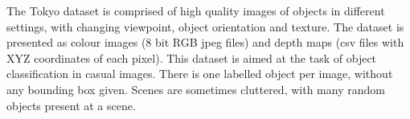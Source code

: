 	The Tokyo dataset is comprised of high quality images of objects in different settings, with changing viewpoint, object orientation and texture. The dataset is presented as colour images (8 bit RGB jpeg files) and depth maps (csv files with XYZ coordinates of each pixel).	This dataset is aimed at the task of object classification in casual images. There is one labelled object per image, without any bounding box given. Scenes are sometimes cluttered, with many random objects present at a scene.